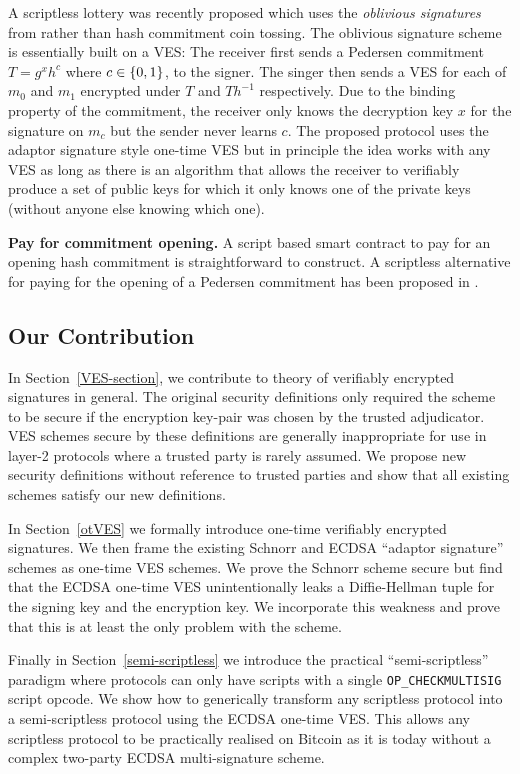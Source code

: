 A scriptless lottery was recently proposed\cite{fournier_lottery} which uses the \emph{oblivious signatures} from \cite{1-of-n-oblivious-signatures} rather than hash commitment coin tossing. The oblivious signature scheme is essentially built on a VES: The receiver first sends a Pedersen commitment $T = g^xh^c$ where $c \in \{0,1\}$, to the signer. The singer then sends a VES for each of $m_0$ and $m_1$ encrypted under $T$ and $Th^{-1}$ respectively. Due to the binding property of the commitment, the receiver only knows the decryption key $x$ for the signature on $m_c$ but the sender never learns $c$. The proposed protocol uses the adaptor signature style one-time VES but in principle the idea works with any VES as long as there is an algorithm that allows the receiver to verifiably produce a set of public keys for which it only knows one of the private keys (without anyone else knowing which one).

\hfill \break  \textbf{Pay for commitment opening.} A script based smart contract to pay for an opening hash commitment is straightforward to construct. A scriptless alternative for paying for the opening of a Pedersen commitment has been proposed in \cite{pay-for-pedersen}.

\subsection{Our Contribution}

In Section~\ref{VES-section}, we contribute to theory of verifiably encrypted signatures in general. The original security definitions\cite{Boneh:2003:AVE:1766171.1766207} only required the scheme to be secure if the encryption key-pair was chosen by the trusted adjudicator. VES schemes secure by these definitions are generally inappropriate for use in layer-2 protocols where a trusted party is rarely assumed. We propose new security definitions without reference to trusted parties and show that all existing schemes satisfy our new definitions.

In Section~\ref{otVES} we formally introduce one-time verifiably encrypted signatures. We then frame the existing Schnorr and ECDSA ``adaptor signature'' schemes as one-time VES schemes. We prove the Schnorr scheme secure but find that the ECDSA one-time VES unintentionally leaks a Diffie-Hellman tuple for the signing key and the encryption key. We incorporate this weakness and prove that this is at least the only problem with the scheme.

Finally in Section~\ref{semi-scriptless} we introduce the practical ``semi-scriptless'' paradigm where protocols can only have scripts with a single \texttt{OP\_CHECKMULTISIG} script opcode. We show how to generically transform any scriptless protocol into a semi-scriptless protocol using the ECDSA one-time VES\@. This allows any scriptless protocol to be practically realised on Bitcoin as it is today without a complex two-party ECDSA multi-signature scheme.


